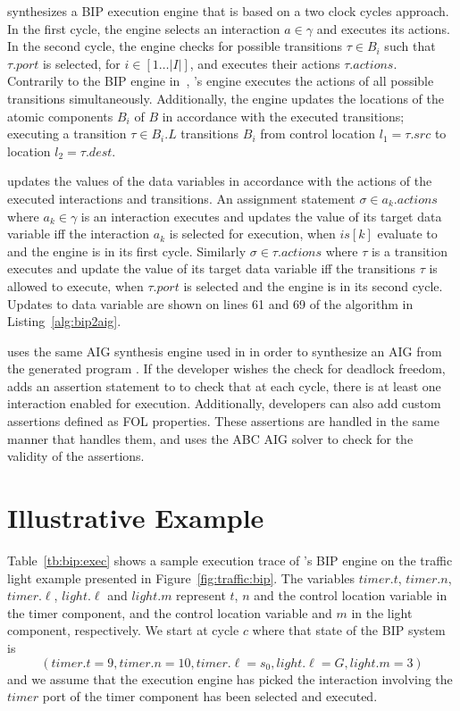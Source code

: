 \biptool{} synthesizes a BIP execution engine that is based on a two clock cycles 
approach. In the first cycle, the engine selects an interaction $a \in \gamma$ 
and executes its actions. In the second cycle, the engine checks for possible
transitions $\tau \in B_i$ such that $\tau.port$ is selected, for $i \in [1\ldots|I|]$,
and executes their actions $\tau.actions$. Contrarily to the BIP engine in~\cite{BasuBBCJNS11},
\biptool's engine executes the actions of all possible transitions simultaneously.
Additionally, the engine updates the locations of the atomic components $B_i$ of $B$
in accordance with the executed transitions; \ie{} executing a transition $\tau \in B_i.L$ 
transitions $B_i$ from control location $l_1 = \tau.src$ to location $l_2 = \tau.dest$.

\biptool{} updates the values of the data variables in accordance with the 
actions of the executed interactions and transitions. An assignment statement 
$\sigma \in a_k.actions$ where $a_k \in \gamma$ is an interaction executes 
and updates the value of its target data variable iff the interaction $a_k$ 
is selected for execution, \ie when $is[k]$ evaluate to \true{} and the engine
is in its first cycle. Similarly $\sigma \in \tau.actions$ where $\tau$ is a transition
executes and update the value of its target data variable iff the transitions $\tau$
is allowed to execute, \ie when $\tau.port$ is selected and the engine is in its
second cycle. Updates to data variable are shown on lines 61 and 69 of the 
algorithm in Listing~\ref{alg:bip2aig}.

\biptool{} uses the same AIG synthesis engine used in \mytool{} in order to 
synthesize an AIG from the generated \thislanguage{} program \aigcircuit. 
If the developer wishes the check for deadlock freedom, \biptool{} adds 
an assertion statement to \aigcircuit{} to check that at each cycle, 
there is at least one interaction enabled for execution. Additionally, 
developers can also add custom assertions defined as FOL properties. These assertions
are handled in the same manner that \mytool{} handles them, and \biptool{}
uses the ABC AIG solver to check for the validity of the assertions. 

\section{Illustrative Example}
Table~\ref{tb:bip:exec} shows a sample execution trace of \mytool's BIP engine
on the traffic light example presented in Figure~\ref{fig:traffic:bip}. The variables 
$timer.t$, $timer.n$, $timer.\ell$, $light.\ell$ and $light.m$ represent $t$, $n$
and the control location variable in the timer component, and the control location variable
and $m$ in the light component, respectively. 
We start at cycle $c$ where that state of the BIP system is $$\left(timer.t = 9, timer.n = 10,
timer.\ell = s_0, light.\ell = G, light.m = 3\right)$$
and we assume that the execution engine has picked the interaction involving the 
$timer$ port of the timer component has been selected and executed. 

